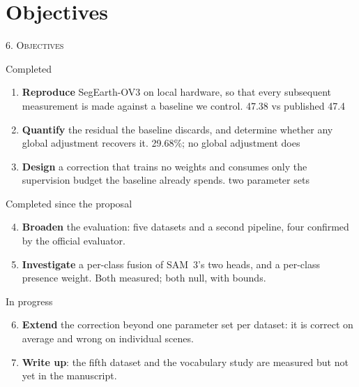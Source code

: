 \documentclass[aspectratio=169]{beamer}
\newcommand{\ok}[1]{\textcolor{good}{#1}}
\begin{document}
\section{Objectives}
\begin{frame}{\textsc{6. Objectives}}
\small
\begin{block}{Completed}
\begin{enumerate}
  \item \textbf{Reproduce} SegEarth-OV3 on local hardware, so that every
        subsequent measurement is made against a baseline we control.
        \hfill \ok{47.38 vs published 47.4}
  \item \textbf{Quantify} the residual the baseline discards, and determine
        whether any global adjustment recovers it.
        \hfill \ok{29.68\%; no global adjustment does}
  \item \textbf{Design} a correction that trains no weights and consumes only the
        supervision budget the baseline already spends.
        \hfill \ok{two parameter sets}
\end{enumerate}
\end{block}
\begin{block}{Completed since the proposal}
\begin{enumerate}
  \setcounter{enumi}{3}
  \item \textbf{Broaden} the evaluation: \ok{five datasets and a second
        pipeline}, four confirmed by the official evaluator.
  \item \textbf{Investigate} a per-class fusion of SAM~3's two heads, and a
        per-class presence weight. \ok{Both measured; both null, with bounds.}
\end{enumerate}
\end{block}
\begin{block}{In progress}
\begin{enumerate}
  \setcounter{enumi}{5}
  \item \textbf{Extend} the correction beyond one parameter set per dataset: it
        is correct on average and wrong on individual scenes.
  \item \textbf{Write up}: the fifth dataset and the vocabulary study are
        measured but not yet in the manuscript.
\end{enumerate}
\end{block}
\end{frame}

\end{document}
